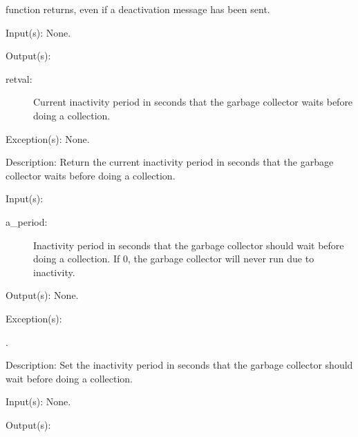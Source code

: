\begin{capi}
\begin{capilist}
		function returns, even if a deactivation message has been sent.
	\end{capilist}
\label{nxa_period_get}
	\begin{capilist}
	\item[Input(s): ] None.
	\item[Output(s): ]
		\begin{description}\item[]
		\item[retval: ]
			Current inactivity period in seconds that the garbage
			collector waits before doing a collection.
		\end{description}
	\item[Exception(s): ] None.
	\item[Description: ]
		Return the current inactivity period in seconds that the garbage
		collector waits before doing a collection.
	\end{capilist}
\label{nxa_period_set}
	\begin{capilist}
	\item[Input(s): ]
		\begin{description}\item[]
		\item[a\_period: ]
			Inactivity period in seconds that the garbage collector
			should wait before doing a collection.  If 0, the
			garbage collector will never run due to inactivity.
		\end{description}
	\item[Output(s): ] None.
	\item[Exception(s): ]
		\begin{description}\item[]
		\item[.]
		\end{description}
	\item[Description: ]
		Set the inactivity period in seconds that the garbage collector
		should wait before doing a collection.
	\end{capilist}
\label{nxa_threshold_get}
	\begin{capilist}
	\item[Input(s): ] None.
	\item[Output(s): ]

\end{capilist}
\end{capi}
